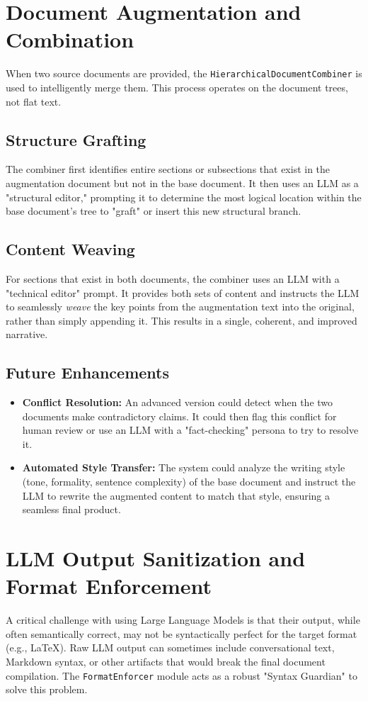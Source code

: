 \documentclass{article}
\begin{document}
\section{Document Augmentation and Combination}
When two source documents are provided, the \texttt{HierarchicalDocumentCombiner} is used to intelligently merge them. This process operates on the document trees, not flat text.

\subsection{Structure Grafting}
The combiner first identifies entire sections or subsections that exist in the augmentation document but not in the base document. It then uses an LLM as a "structural editor," prompting it to determine the most logical location within the base document's tree to "graft" or insert this new structural branch.

\subsection{Content Weaving}
For sections that exist in both documents, the combiner uses an LLM with a "technical editor" prompt. It provides both sets of content and instructs the LLM to seamlessly \textit{weave} the key points from the augmentation text into the original, rather than simply appending it. This results in a single, coherent, and improved narrative.

\subsection{Future Enhancements}
\begin{itemize}
    \item \textbf{Conflict Resolution:} An advanced version could detect when the two documents make contradictory claims. It could then flag this conflict for human review or use an LLM with a "fact-checking" persona to try to resolve it.
    \item \textbf{Automated Style Transfer:} The system could analyze the writing style (tone, formality, sentence complexity) of the base document and instruct the LLM to rewrite the augmented content to match that style, ensuring a seamless final product.
\end{itemize}

\section{LLM Output Sanitization and Format Enforcement}
A critical challenge with using Large Language Models is that their output, while often semantically correct, may not be syntactically perfect for the target format (e.g., LaTeX). Raw LLM output can sometimes include conversational text, Markdown syntax, or other artifacts that would break the final document compilation. The \texttt{FormatEnforcer} module acts as a robust "Syntax Guardian" to solve this problem.
\end{document}
